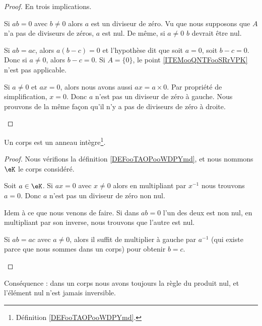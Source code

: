 \begin{proof}
	En trois implications.
	\begin{subproof}

		Si \( ab=0\) avec \( b\neq 0\) alors \( a\) est un diviseur de zéro. Vu que nous supposons que \( A\) n'a pas de diviseurs de zéros, \( a\) est nul. De même, si \( a\neq 0\) \( b\) devrait être nul.

		Si \( ab=ac\), alors \( a(b-c)=0\) et l'hypothèse dit que soit \( a=0\), soit \( b-c=0\). Donc si \( a\neq 0\), alors \( b-c=0\).
		Si \( A=\{ 0 \}\), le point \ref{ITEMooQNTFooSRrVPK} n'est pas applicable.

		Si \( a\neq 0\) et \( ax=0\), alors nous avons aussi \( ax=a\times 0\). Par propriété de simplification, \( x=0\). Donc \( a\) n'est pas un diviseur de zéro à gauche. Nous prouvons de la même façon qu'il n'y a pas de diviseurs de zéro à droite.
	\end{subproof}
\end{proof}

\begin{lemma}		\label{LEMooIKNMooMfvQnu}
	Un corps est un anneau intègre\footnote{Définition \ref{DEFooTAOPooWDPYmd}.}.
\end{lemma}

\begin{proof}
	Nous vérifions la définition \ref{DEFooTAOPooWDPYmd}, et nous nommons \( \eK\) le corps considéré.
	\begin{subproof}
		\spitem[Pour \ref{ITEMooMXMKooXMYpkN}]
		Soit \( a\in \eK\). Si \( ax=0\) avec \( x\neq 0\) alors en multipliant par \( x^{-1}\) nous trouvons \( a=0\). Donc \( a\) n'est pas un diviseur de zéro non nul.

		\spitem[Pour \ref{ITEMooLAJCooFwxXrV}]
		Idem à ce que nous venons de faire. Si dans \( ab=0\) l'un des deux est non nul, en multipliant par son inverse, nous trouvons que l'autre est nul.

		\spitem[Pour \ref{ITEMooQNTFooSRrVPK}]
		Si \( ab=ac\) avec \( a\neq 0\), alors il suffit de multiplier à gauche par \( a^{-1}\) (qui existe parce que nous sommes dans un corps) pour obtenir \( b=c\).
	\end{subproof}
\end{proof}
Conséquence : dans un corps nous avons toujours la règle du produit nul, et l'élément nul n'est jamais inversible.


